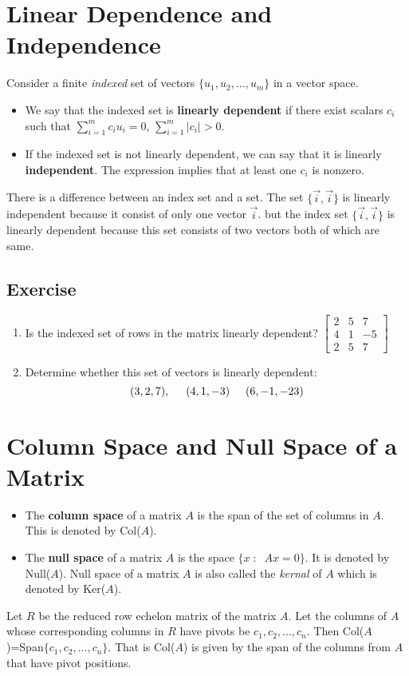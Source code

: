 \documentclass[math101_lecturenotes_ku.tex]{subfiles}
\begin{document}
\section{Linear Dependence and Independence}
Consider a finite \textit{indexed} set of vectors $\{u_1,u_2,...,u_m\}$ in a vector space.
\begin{itemize}
    \item We say that the indexed set is \textbf{linearly dependent} if there exist scalars $c_i$ such that $\displaystyle \sum_{i=1}^m c_iu_i = 0$, \;\;\; $\displaystyle \sum_{i=1}^m |c_i| > 0$.

    \item If the indexed set is not linearly dependent, we can say that it is linearly \textbf{independent}. The expression implies that at least one $c_i$ is nonzero.
\end{itemize}
There is a difference between an index set and a set. The set $\{\vec{i}, \vec{i}\}$ is linearly independent because it consist of only one vector $\vec{i}$. but the index set  $\{\vec{i}, \vec{i}\}$ is linearly dependent because this set consists of two vectors both of which are same.

\subsection{Exercise}
\begin{enumerate}
    \item Is the indexed set of rows in the matrix linearly dependent? $\begin{bmatrix}
    2 & 5 & 7 \\
    4 & 1 & -5 \\
    2  & 5 & 7
\end{bmatrix}$

    \item Determine whether this set of vectors is linearly dependent: $$(3,2,7), \hspace{5mm} (4,1,-3) \hspace{5mm} (6,-1,-23)$$
\end{enumerate}

\section{Column Space and Null Space of a Matrix}

    \begin{itemize}
        \item  The \textbf{column space} of a matrix $A$ is the span of the set of columns in $A$. This is denoted by Col($A$).

        \item The \textbf{null space} of a matrix $A$ is the space $\{x\; : \;\; Ax=0\}$. It is denoted by Null($A$). Null space of a matrix $A$ is also called the \textit{kernal} of $A$ which is denoted by Ker($A$).
    \end{itemize}
\noindent
Let $R$ be the reduced row echelon matrix of the matrix $A$. Let the columns of $A$ whose corresponding columns in $R$ have pivots be $c_1, c_2,...,c_n$. Then Col($A$)=Span$\{c_1, c_2,...,c_n\}$. That is Col($A$) is given by the span of the columns from $A$ that have pivot positions.
\end{document}

